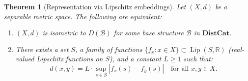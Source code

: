 \documentclass[11pt,a4paper]{article}
\newtheorem{theorem}{Theorem}[section]
\begin{document}
\begin{theorem}[Representation via Lipschitz embeddings]\label{thm:representation}
Let $(X,d)$ be a separable metric space. The following are equivalent:
\begin{enumerate}
\item $(X,d)$ is isometric to $D(\mathcal{B})$ for some base structure
$\mathcal{B}$ in $\mathbf{DistCat}$.
\item There exists a set $S$, a family of functions
$\{f_x:x\in X\}\subset\operatorname{Lip}(S,\mathbb{R})$ (real-valued
Lipschitz functions on $S$), and a constant $L\geq 1$ such that:
\begin{equation}
d(x,y)=L\cdot\sup_{s\in S}|f_x(s)-f_y(s)|\quad\text{for all }x,y\in X.
\end{equation}
\end{enumerate}
\end{theorem}
\end{document}
